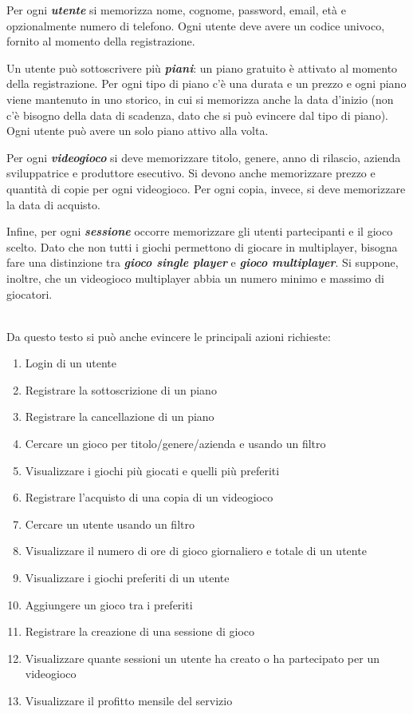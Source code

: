\documentclass[a4paper,12pt]{report}
\begin{document}
\begin{addmargin}[4em]{4em}
Per ogni \textbf{\textit{utente}} si memorizza nome, cognome, password, email, età e opzionalmente numero di telefono. Ogni utente deve avere un codice univoco, fornito al momento della registrazione.

Un utente può sottoscrivere più \textbf{\textit{piani}}: un piano gratuito è attivato al momento della registrazione. Per ogni tipo di piano c'è una durata e un prezzo e ogni piano viene mantenuto in uno storico, in cui si memorizza anche la data d'inizio (non c'è bisogno della data di scadenza, dato che si può evincere dal tipo di piano). Ogni utente può avere un solo piano attivo alla volta.

Per ogni \textbf{\textit{videogioco}} si deve memorizzare titolo, genere, anno di rilascio, azienda sviluppatrice e produttore esecutivo. Si devono anche memorizzare prezzo e quantità di copie per ogni videogioco. Per ogni copia, invece, si deve memorizzare la data di acquisto.

Infine, per ogni \textbf{\textit{sessione}} occorre memorizzare gli utenti partecipanti e il gioco scelto. Dato che non tutti i giochi permettono di giocare in multiplayer, bisogna fare una distinzione tra \textbf{\textit{gioco single player}} e \textbf{\textit{gioco multiplayer}}. Si suppone, inoltre, che un videogioco multiplayer abbia un numero minimo e massimo di giocatori. \\\\

\end{addmargin}

Da questo testo si può anche evincere le principali azioni richieste:

\begin{enumerate}
\item Login di un utente
\item Registrare la sottoscrizione di un piano
\item Registrare la cancellazione di un piano
\item Cercare un gioco per titolo/genere/azienda e usando un filtro
\item Visualizzare i giochi più giocati e quelli più preferiti
\item Registrare l'acquisto di una copia di un videogioco
\item Cercare un utente usando un filtro
\item Visualizzare il numero di ore di gioco giornaliero e totale di un utente
\item Visualizzare i giochi preferiti di un utente
\item Aggiungere un gioco tra i preferiti
\item Registrare la creazione di una sessione di gioco
\item Visualizzare quante sessioni un utente ha creato o ha partecipato per un videogioco
\item Visualizzare il profitto mensile del servizio
\end{enumerate}
\end{document}
